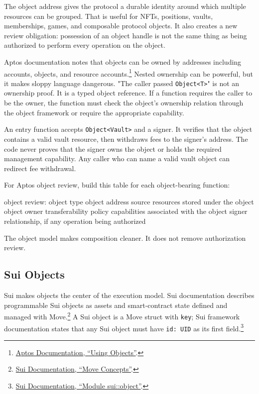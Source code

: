 The object address gives the protocol a durable identity around which multiple resources can be grouped. That is useful for NFTs, positions, vaults, memberships, games, and composable protocol objects. It also creates a new review obligation: possession of an object handle is not the same thing as being authorized to perform every operation on the object.

Aptos documentation notes that objects can be owned by addresses including accounts, objects, and resource accounts.\footnote{\href{https://aptos.dev/build/smart-contracts/object/using-objects}{Aptos Documentation, ``Using Objects''}.} Nested ownership can be powerful, but it makes sloppy language dangerous. "The caller passed \texttt{Object<T>}" is not an ownership proof. It is a typed object reference. If a function requires the caller to be the owner, the function must check the object's ownership relation through the object framework or require the appropriate capability.

\begin{failuremodebox}
An entry function accepts \texttt{Object<Vault>} and a signer. It verifies that the object contains a valid vault resource, then withdraws fees to the signer's address. The code never proves that the signer owns the object or holds the required management capability. Any caller who can name a valid vault object can redirect fee withdrawal.
\end{failuremodebox}

For Aptos object review, build this table for each object-bearing function:

\begin{codeblock}
object review:
    object type
    object address source
    resources stored under the object
    object owner
    transferability policy
    capabilities associated with the object
    signer relationship, if any
    operation being authorized
\end{codeblock}

The object model makes composition cleaner. It does not remove authorization review.

\subsection{Sui Objects}

Sui makes objects the center of the execution model. Sui documentation describes programmable Sui objects as assets and smart-contract state defined and managed with Move.\footnote{\href{https://docs.sui.io/develop/write-move/sui-move-concepts}{Sui Documentation, ``Move Concepts''}.} A Sui object is a Move struct with \texttt{key}; Sui framework documentation states that any Sui object must have \texttt{id: UID} as its first field.\footnote{\href{https://docs.sui.io/references/framework/sui_sui/object}{Sui Documentation, ``Module sui::object''}.}

